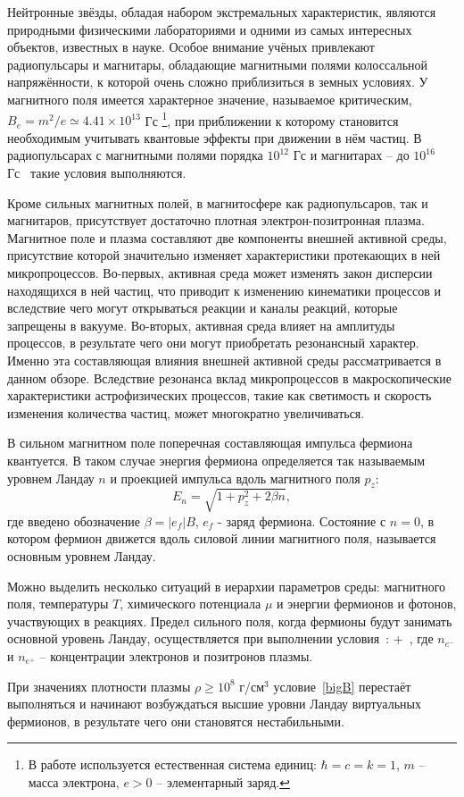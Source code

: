 Нейтронные звёзды, обладая набором экстремальных характеристик, являются природными физическими лабораториями и одними из самых интересных объектов, известных в науке. 
Особое внимание учёных привлекают радиопульсары и магнитары, обладающие магнитными полями колоссальной напряжённости, к которой очень сложно приблизиться в
земных условиях. У магнитного поля имеется характерное значение, называемое критическим, $B_e = m^2 / e \simeq 4.41 \times 10^{13}$ Гс \footnote{В работе используется естественная система единиц: 
$\hbar = c = k = 1$, $m$ -- масса электрона, $e > 0$ --  элементарный заряд.}, при приближении к которому становится необходимым учитывать квантовые эффекты при движении в нём частиц. 
В радиопульсарах с магнитными полями порядка $10^{12}$ Гс и магнитарах -- до $10^{16}$ Гс~\cite{Duncan:1995,Thompson:1996,Lyutikov:2002} такие условия выполняются.

Кроме сильных магнитных полей, в магнитосфере как радиопульсаров, так и магнитаров, присутствует достаточно плотная электрон-позитронная плазма. Магнитное поле и плазма составляют 
две компоненты внешней активной среды, присутствие которой значительно изменяет характеристики протекающих в ней микропроцессов. Во-первых, активная среда может изменять закон дисперсии 
находящихся в ней частиц, что приводит к изменению кинематики процессов и вследствие чего могут открываться реакции и каналы реакций, которые запрещены в вакууме. Во-вторых, активная среда 
влияет на амплитуды процессов, в результате чего они могут приобретать резонансный характер. Именно эта составляющая влияния внешней активной среды рассматривается в данном обзоре. 
Вследствие резонанса вклад микропроцессов в макроскопические характеристики астрофизических процессов, такие как светимость и скорость изменения количества частиц, может 
многократно увеличиваться.

В сильном магнитном поле поперечная составляющая импульса фермиона квантуется. В таком случае энергия фермиона определяется так называемым уровнем Ландау $n$ и проекцией импульса вдоль магнитного поля $p_z$:
\begin{equation}
E_n = \sqrt{1+p_z^2+2\beta n},
\end{equation}
%
где введено обозначение $\beta=|e_f|B$, $e_f$ - заряд фермиона. Состояние с $n = 0$, в котором фермион движется вдоль силовой линии магнитного поля, называется основным уровнем Ландау. 

Можно выделить несколько ситуаций в иерархии параметров среды: магнитного поля, температуры $T$, химического потенциала $\mu$ и энергии фермионов и фотонов, участвующих в реакциях.
Предел сильного поля, когда фермионы будут занимать основной уровень Ландау, осуществляется при выполнении условия~\cite{RCh:2008}:
%
\beq
\label{bigB}
 \gg {} + \,,
\eeq 
%
\noindent где $n_{e^{-}}$ и $n_{e^{+}}$ -- концентрации электронов и позитронов плазмы.

При значениях плотности плазмы $\rho \geqslant 10^8$ г/см$^3$ условие~\ref{bigB} перестаёт выполняться и начинают возбуждаться 
высшие уровни Ландау виртуальных фермионов, в результате чего они становятся нестабильными. 